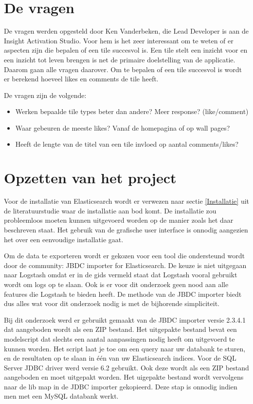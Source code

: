 \section{De vragen}
De vragen werden opgesteld door Ken Vanderbeken, die Lead Developer is aan de Insight Activation Studio. Voor hem is het zeer interessant om te weten of er aspecten zijn die bepalen of een tile succesvol is. Een tile stelt een inzicht voor en een inzicht tot leven brengen is net de primaire doelstelling van de applicatie. Daarom gaan alle vragen daarover. Om te bepalen of een tile succesvol is wordt er berekend hoeveel likes en comments de tile heeft.

De vragen zijn de volgende:
\begin{itemize}
	\item Werken bepaalde tile types beter dan andere? Meer response? (like/comment) 
	\item Waar gebeuren de meeste likes? Vanaf de homepagina of op wall pages?
	\item Heeft de lengte van de titel van een tile invloed op aantal comments/likes? 
\end{itemize}

\section{Opzetten van het project}

Voor de installatie van Elasticsearch wordt er verwezen naar sectie \ref{Installatie} uit de literatuurstudie waar de installatie aan bod komt. De installatie zou probleemloos moeten kunnen uitgevoerd worden op de manier zoals het daar beschreven staat. Het gebruik van de grafische user interface is onnodig aangezien het over een eenvoudige installatie gaat.

Om de data te exporteren wordt er gekozen voor een tool die ondersteund wordt door de community: JBDC importer for Elasticsearch. De keuze is niet uitgegaan naar Logstash omdat er in de gids vermeld staat dat Logstash vooral gebruikt wordt om logs op te slaan. Ook is er voor dit onderzoek geen nood aan alle features die Logstash te bieden heeft. De methode van de JBDC importer biedt dus alles wat voor dit onderzoek nodig is met de bijhorende simpliciteit.

Bij dit onderzoek werd er gebruikt gemaakt van de JBDC importer versie 2.3.4.1 dat aangeboden wordt als een ZIP bestand. Het uitgepakte bestand bevat een modelscript dat slechts een aantal aanpassingen nodig heeft om uitgevoerd te kunnen worden. Het script laat je toe om een query naar uw databank te sturen, en de resultaten op te slaan in één van uw Elasticsearch indices. Voor de SQL Server JDBC driver werd versie 6.2 gebruikt. Ook deze wordt als een ZIP bestand aangeboden en moet uitgepakt worden. Het uigepakte bestand wordt vervolgens naar de lib map in de JDBC importer gekopieerd. Deze stap is onnodig indien men met een MySQL databank werkt. 

